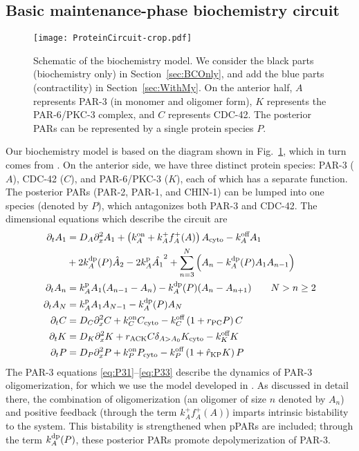 \documentclass[11pt]{article}
\newcommand{\6}[1]{#1_{\text{6}}}
\newcommand{\3}[1]{#1_{\text{3}}}
\begin{document}
\subsection{Basic maintenance-phase biochemistry circuit \label{sec:BCOnly}}
\begin{figure}
\centering
\texttt{[image: ProteinCircuit-crop.pdf]}
\caption{\label{fig:ModelSch}Schematic of the biochemistry model. We consider the black parts (biochemistry only) in Section\ \ref{sec:BCOnly}, and add the blue parts (contractility) in Section\ \ref{sec:WithMy}. On the anterior half, $A$ represents PAR-3 (in monomer and oligomer form), $K$ represents the PAR-6/PKC-3 complex, and $C$ represents CDC-42. The posterior PARs can be represented by a single protein species $P$.}
\end{figure}

Our biochemistry model is based on the diagram shown in Fig.\ \ref{fig:ModelSch}, which in turn comes from \cite[Fig.~2]{lang2017proteins}. On the anterior side, we have three distinct protein species: PAR-3 ($A$), CDC-42 ($C$), and PAR-6/PKC-3 ($K$), each of which has a separate function. The posterior PARs (PAR-2, PAR-1, and CHIN-1) can be lumped into one species (denoted by $P$), which antagonizes both PAR-3 and CDC-42. The dimensional equations which describe the circuit are 
\begin{subequations}
\label{eq:AllBC}
\begin{align}
\label{eq:P31}
\partial_t A_1 & = D_A \partial_x^2 A_1 + \left(k^\text{on}_A+k^+_A f^+_A(A) \right)A_\text{cyto}- k^\text{off}_A A_1  \\  \nonumber
 &+ 2 k^\text{dp}_A(P) \hat{A}_2-2k^\text{p}_A \hat{A_1}^2+\sum_{n=3}^N \left(A_n-k^\text{dp}_A(P) A_1 A_{n-1}\right)  \\ 
\partial_t A_n & =k^\text{p}_{A}A_1 (A_{n-1}-A_n) -k^\text{dp}_A(P)(A_n-A_{n+1})  \qquad N > n \geq 2 \\ 
\label{eq:P33}
\partial_t A_N & =k^\text{p}_A A_1  A_{N-1}-k^\text{dp}_A(P) A_N \\
\label{eq:Ceqn}
\partial_t C& =D_C \partial_x^2 {C} +k^\text{on}_C C_\text{cyto}  - k^\text{off}_C \left(1+r_\text{PC}P\right)C\\
\label{eq:Keqn}
\partial_t {K}  &= D_K \partial_x^2 {K} + {r}_\text{ACK} {C} \delta_{A > A_0}K_\text{cyto}-k^\text{off}_K K \\
\partial_t {P} & =D_P \partial_x^2 {P} +k^\text{on}_P P_\text{cyto}  - k^\text{off}_P \left(1+\hat{r}_\text{KP}{K}\right){P}
\end{align}
\end{subequations}
The PAR-3 equations \eqref{eq:P31}--\eqref{eq:P33} describe the dynamics of PAR-3 oligomerization, for which we use the model developed in \cite{lang2023oligomerization}. As discussed in detail there, the combination of oligomerization (an oligomer of size $n$ denoted by $A_n$) and positive feedback (through the term $k^+_A f^+_A(A)$) imparts intrinsic bistability to the system. This bistability is strengthened when pPARs are included; through the term $k^\text{dp}_A(P)$, these posterior PARs promote depolymerization of PAR-3.
\end{document}
